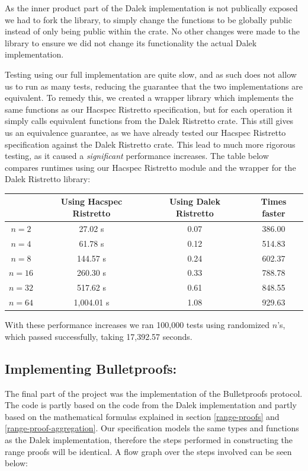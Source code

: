 \documentclass{article}
\begin{document}
As the inner product part of the Dalek implementation is not publically
exposed we had to fork the library, to simply change the functions to be
globally public instead of only being public within the crate. No other
changes were made to the library to ensure we did not change its 
functionality the actual Dalek implementation.

Testing using our full implementation are quite slow, and as such does 
not allow us to run as many tests, reducing the guarantee that the two 
implementations are equivalent. To remedy this, we created a wrapper 
library which implements the same functions as our Hacspec Ristretto 
specification, but for each operation it simply calls equivalent functions 
from the Dalek Ristretto crate. This still gives us an equivalence 
guarantee, as we have already tested our Hacspec Ristretto specification 
against the Dalek Ristretto crate. This lead to much more rigorous 
testing, as it caused a \textit{significant} performance increases. The 
table below compares runtimes using our Hacspec Ristretto module and the 
wrapper for the Dalek Ristretto library:

\begin{center}
\begin{tabular}{ c|c|c|c } 
          & Using Hacspec Ristretto & Using Dalek Ristretto & Times faster \\ \hline\hline
 $n = 2$  & 27.02 s    & 0.07 & 386.00 \\ \hline
 $n = 4$  & 61.78 s    & 0.12 & 514.83 \\ \hline
 $n = 8$  & 144.57 s   & 0.24 & 602.37 \\ \hline
 $n = 16$ & 260.30 s   & 0.33 & 788.78 \\ \hline
 $n = 32$ & 517.62 s   & 0.61 & 848.55 \\ \hline
 $n = 64$ & 1,004.01 s & 1.08 & 929.63 \\ \hline
\end{tabular}
\end{center}

With these performance increases we ran 100,000 tests using
randomized $n$'s, which passed successfully, taking 17,392.57 seconds.

\subsection{Implementing Bulletproofs:} \label{implementing-bulletproofs}

The final part of the project was the implementation of the
Bulletproofs protocol. The code is partly based on the code from the Dalek
implementation and partly based on the mathematical formulas explained
in section \ref{range-proofs} and \ref{range-proof-aggregation}. Our
specification models the same types and functions as the Dalek
implementation, therefore the steps performed in constructing the range
proofs will be identical. A flow graph over the steps involved
can be seen below:
\end{document}

